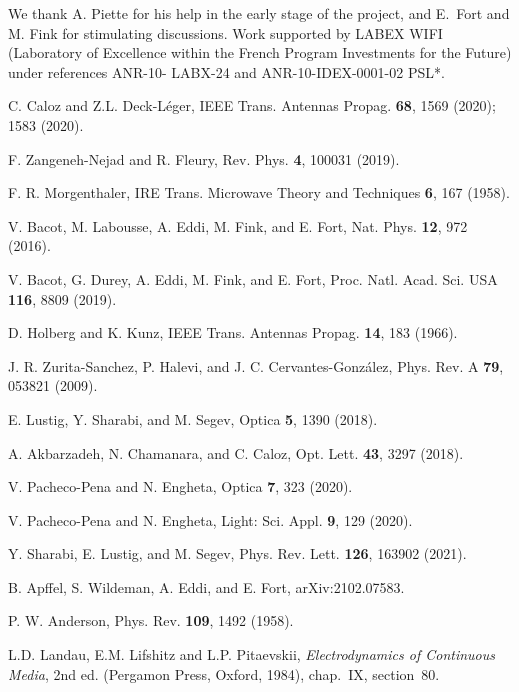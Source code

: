 \documentclass[ prl, twocolumn, superscriptaddress, amsfonts, amsmath,floatfix]{revtex4-1}
\begin{document}
\begin{acknowledgments}
We thank A. Piette for his help in the early stage of the project, and E.~Fort and M. Fink for stimulating discussions. Work supported by LABEX WIFI (Laboratory of Excellence within the French Program Investments for the Future) under references ANR-10- LABX-24 and ANR-10-IDEX-0001-02 PSL*.
\end{acknowledgments}

\begin{thebibliography}{40}
 
C. Caloz and Z.L. Deck-L\'eger, IEEE Trans. Antennas Propag. {\bf 68}, 1569 (2020); 1583 (2020).

F. Zangeneh-Nejad and R. Fleury, Rev. Phys. {\bf 4}, 100031 (2019).

F. R. Morgenthaler, IRE Trans. Microwave Theory and Techniques {\bf 6}, 167 (1958).

V. Bacot, M. Labousse, A. Eddi, M. Fink, and E. Fort, Nat. Phys. {\bf 12}, 972 (2016).

V. Bacot, G. Durey, A. Eddi, M. Fink, and E. Fort, Proc. Natl. Acad. Sci. USA {\bf 116}, 8809 (2019).

D. Holberg and K. Kunz,  IEEE Trans. Antennas Propag. {\bf 14}, 183 (1966).

J. R. Zurita-Sanchez, P. Halevi, and J. C. Cervantes-Gonz\' alez, Phys. Rev. A {\bf 79}, 053821 (2009).

E. Lustig, Y. Sharabi, and M. Segev,  Optica {\bf 5}, 1390 (2018).

A. Akbarzadeh, N. Chamanara, and C. Caloz, Opt. Lett. {\bf 43}, 3297 (2018).

V. Pacheco-Pena and N. Engheta, Optica {\bf 7}, 323 (2020).

V. Pacheco-Pena and N. Engheta, Light: Sci. Appl. {\bf 9}, 129 (2020).

Y. Sharabi, E. Lustig, and M. Segev, Phys. Rev. Lett. {\bf 126}, 163902 (2021).

B. Apffel, S. Wildeman, A. Eddi, and E. Fort, arXiv:2102.07583.  

P. W. Anderson, Phys. Rev. {\bf 109}, 1492 (1958).


L.D. Landau, E.M. Lifshitz and L.P. Pitaevskii, {\it Electrodynamics of Continuous Media}, 2nd ed. (Pergamon Press, Oxford, 1984), chap.~IX, section~80.


\end{thebibliography}
\end{document}
